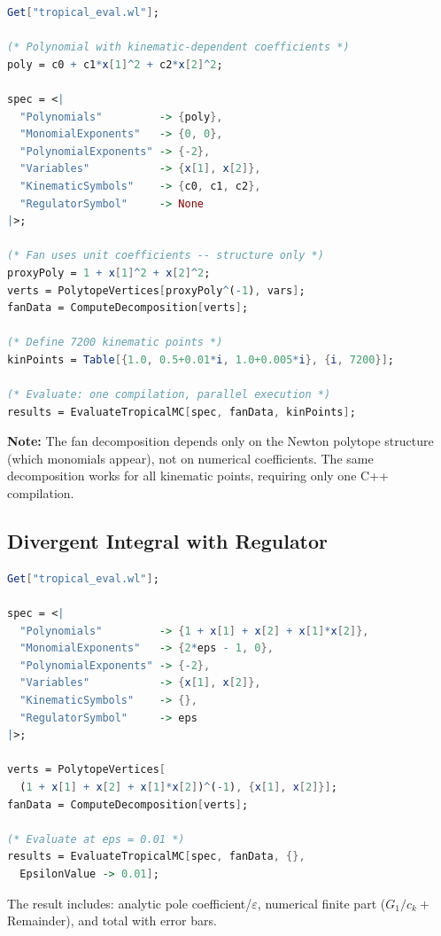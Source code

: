 \documentclass[11pt,a4paper]{article}
\begin{document}
\begin{lstlisting}[language=Mathematica]
Get["tropical_eval.wl"];

(* Polynomial with kinematic-dependent coefficients *)
poly = c0 + c1*x[1]^2 + c2*x[2]^2;

spec = <|
  "Polynomials"         -> {poly},
  "MonomialExponents"   -> {0, 0},
  "PolynomialExponents" -> {-2},
  "Variables"           -> {x[1], x[2]},
  "KinematicSymbols"    -> {c0, c1, c2},
  "RegulatorSymbol"     -> None
|>;

(* Fan uses unit coefficients -- structure only *)
proxyPoly = 1 + x[1]^2 + x[2]^2;
verts = PolytopeVertices[proxyPoly^(-1), vars];
fanData = ComputeDecomposition[verts];

(* Define 7200 kinematic points *)
kinPoints = Table[{1.0, 0.5+0.01*i, 1.0+0.005*i}, {i, 7200}];

(* Evaluate: one compilation, parallel execution *)
results = EvaluateTropicalMC[spec, fanData, kinPoints];
\end{lstlisting}

\textbf{Note:} The fan decomposition depends only on the Newton polytope structure (which monomials appear), not on numerical coefficients. The same decomposition works for all kinematic points, requiring only one C++ compilation.

\subsection{Divergent Integral with Regulator}

\begin{lstlisting}[language=Mathematica]
Get["tropical_eval.wl"];

spec = <|
  "Polynomials"         -> {1 + x[1] + x[2] + x[1]*x[2]},
  "MonomialExponents"   -> {2*eps - 1, 0},
  "PolynomialExponents" -> {-2},
  "Variables"           -> {x[1], x[2]},
  "KinematicSymbols"    -> {},
  "RegulatorSymbol"     -> eps
|>;

verts = PolytopeVertices[
  (1 + x[1] + x[2] + x[1]*x[2])^(-1), {x[1], x[2]}];
fanData = ComputeDecomposition[verts];

(* Evaluate at eps = 0.01 *)
results = EvaluateTropicalMC[spec, fanData, {},
  EpsilonValue -> 0.01];
\end{lstlisting}

The result includes: analytic pole coefficient/$\varepsilon$, numerical finite part ($G_1/c_k +$ Remainder), and total with error bars.
\end{document}
